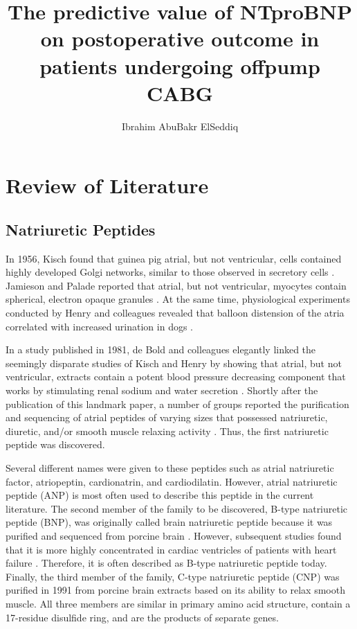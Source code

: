 \documentclass[14pt,a4paper,onecolumn]{extarticle}
\author{Ibrahim AbuBakr ElSeddiq}
\title{The predictive value of NTproBNP on postoperative outcome in patients undergoing offpump CABG}
\begin{document}
\maketitle
\clearpage
\clearpage
\section{Review of Literature}

\subsection{Natriuretic Peptides}


In 1956, Kisch found that guinea pig atrial, but not ventricular, cells contained highly developed Golgi networks, similar to those observed in secretory cells \citep{Kisch1956}. Jamieson and Palade reported that atrial, but not ventricular, myocytes contain spherical, electron opaque granules \citep{Jamieson1964}. At the same time, physiological experiments conducted by Henry and colleagues revealed that balloon distension of the atria correlated with increased urination in dogs \citep{Henry1956}.

In a study published in 1981, de Bold and colleagues elegantly linked the seemingly disparate studies of Kisch and Henry by showing that atrial, but not ventricular, extracts contain a potent blood pressure decreasing component that works by stimulating renal sodium and water secretion \citep{deBold1981}. Shortly after the publication of this landmark paper, a number of groups reported the purification and sequencing of atrial peptides of varying sizes that possessed natriuretic, diuretic, and/or smooth muscle relaxing activity \citep{Currie1984}  \citep{Flynn1983} \citep{Kangawa1984} \citep{Misono1984}. Thus, the first natriuretic peptide was discovered.

 Several different names were given to these peptides such as atrial natriuretic factor, atriopeptin, cardionatrin, and cardiodilatin. However, atrial natriuretic peptide (ANP) is most often used to describe this peptide in the current literature. The second member of the family to be discovered, B-type natriuretic peptide (BNP), was originally called brain natriuretic peptide because it was purified and sequenced from porcine brain \citep{Sudoh1988}. However, subsequent studies found that it is more highly concentrated in cardiac ventricles of patients with heart failure \citep{Mukoyama1991}  \citep{Mukoyama1990}. Therefore, it is often described as B-type natriuretic peptide today. Finally, the third member of the family, C-type natriuretic peptide (CNP) was purified in 1991 from porcine brain extracts based on its ability to relax smooth muscle. All three members are similar in primary amino acid structure, contain a 17-residue disulfide ring, and are the products of separate genes.\citep{Sudoh1990}
\end{document}
